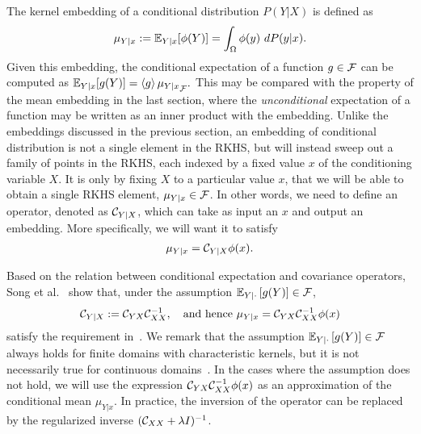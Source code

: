 \documentclass[11pt]{article}
\begin{document}
The kernel embedding of a conditional distribution $P(Y|X)$ is defined as~\cite{SonHuaSmoFuk09}
\begin{align}
    \label{eq:conditionalembedding}
    \mu_{Y|x} :=\mathbb{E}_{Y|x}[\phi(Y)] = \int_{\Omega} \phi(y)~dP(y|x).
\end{align}
Given this embedding, the conditional expectation of a function $g\in \mathcal{F}$  can be computed as
$
    \label{eq:conditionalexpectation}
    \mathbb{E}_{Y|x}[g(Y)] = \left<g\right>{\mu_{Y|x}}_{\mathcal{F}}.
$
This may be compared with the property of the mean embedding in the last section,
where the {\em unconditional} expectation of a function may be written as an inner product with the embedding.
Unlike the embeddings discussed in the previous section, an embedding of conditional distribution is not a single element in the RKHS, but will instead sweep out a family of
points in the RKHS, each indexed by a fixed value $x$ of the conditioning variable $X$. It is only
by fixing $X$ to a particular value $x$, that we will be able to obtain a single RKHS element, $\mu_{Y|x}\in\mathcal{F}$. In other words, we need to define an operator, denoted as $\mathcal{C}_{Y|X}$, which can take as input an $x$ and output an embedding. More specifically, we will
want it to satisfy
\begin{align}
    \label{eq:conditionalembeddingrequirement}
    \mu_{Y|x} = \mathcal{C}_{Y|X} \phi(x).
\end{align}

Based on the relation between conditional expectation and covariance operators, Song et al.~\cite{SonHuaSmoFuk09} show that, under the assumption $\mathbb{E}_{Y|\cdot} \left[g(Y)\right]\in\mathcal{F}$,
\begin{align}
    \label{eq:conditionalembeddingoperator}
    \mathcal{C}_{Y|X}:=\mathcal{C}_{YX}\mathcal{C}_{XX}^{-1},\quad\text{and hence}~\mu_{Y|x} = \mathcal{C}_{YX} \mathcal{C}_{XX}^{-1} \phi(x)
\end{align}
satisfy the requirement in~.
We remark that the assumption $\mathbb{E}_{Y|\cdot} \left[g(Y)\right]\in\mathcal{F}$ always holds for finite domains with characteristic kernels, but it is not necessarily true for continuous domains~\cite{FukBacJor04}. In the cases where the assumption does not hold,
we will use the expression $\mathcal{C}_{YX}\mathcal{C}_{XX}^{-1} \phi(x)$ as an approximation of the conditional mean $\mu_{Y|x}$.
In practice, the inversion of the operator can be replaced by the regularized inverse $(\mathcal{C}_{XX}+\lambda I)^{-1}$.
\end{document}
